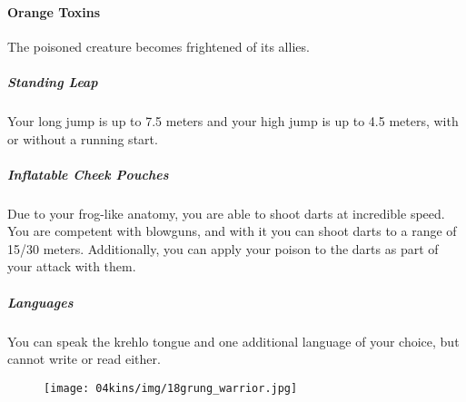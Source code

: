 \paragraph{Orange Toxins} The poisoned creature becomes frightened of its allies.


\subparagraph{Standing Leap} Your long jump is up to 7.5 meters and your high jump is up to 4.5 meters, with or without a running start.


\subparagraph{Inflatable Cheek Pouches} Due to your frog-like anatomy, you are able to shoot darts at incredible speed.
You are competent with blowguns, and with it you can shoot darts to a range of 15/30 meters.
Additionally, you can apply your poison to the darts as part of your attack with them.


\subparagraph{Languages} You can speak the krehlo tongue and one additional language of your choice, but cannot write or read either.

\begin{figure}[!b]
    \centering
    \texttt{[image: 04kins/img/18grung\_warrior.jpg]}
\end{figure}


\newpage
